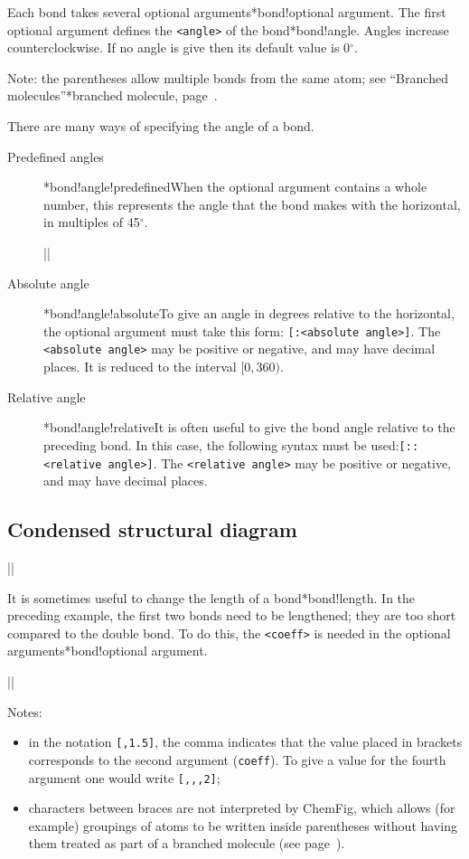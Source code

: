 \documentclass[10pt]{article}
\makeatletter
\newcommand\idx{\@ifstar{\let\print@or@not\@gobble\idx@}{\let\print@or@not\@firstofone\idx@}}
\newcommand\idx@[1]{%
	\ifcat\expandafter\noexpand\@car#1\@nil\relax%
		\expandafter\ifx\@car#1\@nil\protect
			\index{#1}%
			\print@or@not{#1}%
		\else
			\saveexpandmode\expandarg
			\StrSubstitute{\string#1}{\string @}{\@empty\protect\symbol{'100}}[\temp@]%
			\StrGobbleLeft\temp@1[\temp@]%
			\restoreexpandmode
			\expandafter\index\expandafter{\temp@ @\protect\texttt{\protect\textbackslash\temp@}}%
			\print@or@not{\texttt{\string#1}}%
		\fi
	\else
		\index{#1}%
		\print@or@not{#1}%
	\fi
}
\newcommand\make@car@active[2]{%
	\catcode`#1\active
	\begingroup
		\lccode`\~`#1\relax
		\lowercase{\endgroup\def~{#2}}%
}
\newif\if@exstar
\newcommand\exemple{%
	\begingroup
	\parskip\z@
	\@makeother\;\@makeother\!\@makeother\?\@makeother\:%
	\@ifstar{\@exstartrue\exemple@}{\@exstarfalse\exemple@}}
\newcommand\exemple@[2][65]{%
	\medbreak\noindent
	\begingroup
		\let\do\@makeother\dospecials
		\make@car@active\ { {}}%
		\make@car@active\^^M{\par\leavevmode}%
		\make@car@active\,{\leavevmode\kern\z@\string,}%
		\make@car@active\-{\leavevmode\kern\z@\string-}%
		\make@car@active\>{\leavevmode\kern\z@\string>}%
		\make@car@active\<{\leavevmode\kern\z@\string<}%
		\exemple@@{#1}{#2}%
}
\newcommand\exemple@@[3]{%
	\def\@tempa##1#3{\exemple@@@{#1}{#2}{##1}}%
	\@tempa
}
\newcommand\exemple@@@[3]{%
	\xdef\the@code{#3}%
	\endgroup
	\if@exstar
		\begingroup
			\fboxrule0.4pt
			\let\breakboxparindent\z@
			\def\bkvz@bottom{\hrule\@height\fboxrule}%
			\let\bkvz@before@breakbox\relax
			\def\bkvz@set@linewidth{\advance\linewidth\dimexpr-2\fboxrule-2\fboxsep}%
			\def\bkvz@left{\vrule\@width\fboxrule\hskip\fboxsep}%
			\def\bkvz@right{\hskip\fboxsep\vrule\@width\fboxrule}%
			\def\bkvz@top{\hbox to \hsize{%
				\vrule\@width\fboxrule\@height\fboxrule
				\leaders\bkvz@bottom\hfill
				\ECFAugie
				\fboxsep\z@
				\colorbox{black}{\kern0.25em\color{white}\footnotesize\lower0.5ex\hbox{\strut#2}\kern0.25em}%
				\leaders\bkvz@bottom\hfill
				\vrule\@width\fboxrule\@height\fboxrule}}%
			\breakbox
				\kern.5ex\relax
				\ttfamily\footnotesize\the@code\par
				\normalfont
				\kern3pt
				\hrule height0.1pt width\linewidth depth0.1pt
				\vskip5pt
				\rightskip0pt plus 1fill
				\everypar{{\color{lightgray}\rlap{\vrule height0.1pt width\linewidth depth0.1pt}}\hskip0pt plus 1fill}%
				\newlinechar`\^^M\everyeof{\noexpand}\scantokens{#3}\par
			\endbreakbox
		\endgroup
	\else
		\vskip0.5ex
		\boxput*(0,1)
			{\fboxsep\z@
			\hbox{\ECFAugie\colorbox{black}{\leavevmode\kern0.25em{\color{white}\footnotesize\strut#2}\kern0.25em}}%
			}%
			{\fboxsep5pt
			\fbox{%
				$\vcenter{\hsize\dimexpr0.#1\linewidth-\fboxsep-\fboxrule\relax
					\kern5pt\parskip0pt \ttfamily\footnotesize\the@code}%
				\vcenter{\kern5pt\hsize\dimexpr\linewidth-0.#1\linewidth-\fboxsep-\fboxrule\relax
					\everypar{{\color{lightgray}\rlap{\vrule height0.1pt width\dimexpr\linewidth-0.#1\linewidth-\fboxsep-\fboxrule depth0.1pt}}}%
					\footnotesize\newlinechar`\^^M\everyeof{\noexpand}\scantokens{#3}}$%
				}%
			}%
	\fi
	\medbreak
	\endgroup
}
\let\do\@makeother\dospecials
\def\degres{\ensuremath{{}^\circ}}
\newcommand\CF{{\ECFAugie ChemFig}\xspace}
\makeatother
\begin{document}
Each bond takes several optional arguments\idx*{bond!optional argument}. The first optional argument defines the \verb-<angle>- of the bond\idx*{bond!angle}. Angles increase counterclockwise. If no angle is give then its default value is 0\degres.

Note: the parentheses allow multiple bonds from the same atom; see ``Branched molecules''\idx*{branched molecule}, page~\pageref{molecules.ramifiees}.

There are many ways of specifying the angle of a bond.
\begin{description}
\item[Predefined angles] \idx*{bond!angle!predefined}When the optional argument contains a whole number, this represents the angle that the bond makes with the horizontal, in multiples of 45\degres.

\exemple{Predefined angles}||

\item[Absolute angle] \idx*{bond!angle!absolute}To give an angle in degrees relative to the horizontal, the optional argument must take this form: \verb-[:<absolute angle>]-. The \verb-<absolute angle>- may be positive or negative, and may have decimal places. It is reduced to the interval $[0,360)$.
\item[Relative angle] \idx*{bond!angle!relative}It is often useful to give the bond angle relative to the preceding bond. In this case, the following syntax must be used:\verb-[::<relative angle>]-. The \verb-<relative angle>- may be positive or negative, and may have decimal places.
\end{description}

\subsection{Condensed structural diagram}
\exemple{Hex-1-ene}||

It is sometimes useful to change the length of a bond\idx*{bond!length}. In the preceding example, the first two bonds need to be lengthened; they are too short compared to the double bond. To do this, the \verb|<coeff>| is needed in the optional arguments\idx*{bond!optional argument}.

\exemple{Hex-1-ene}||

Notes:
\begin{itemize}
	\item in the notation \verb|[,1.5]|, the comma indicates that the value placed in brackets corresponds to the second argument (\verb|coeff|). To give a value for the fourth argument one would write \verb|[,,,2]|;
	\item characters between braces are not interpreted by \CF, which allows (for example) groupings of atoms to be written inside parentheses without having them treated as part of a branched molecule (see page~\pageref{molecules.ramifiees}).
\end{itemize}
\end{document}
